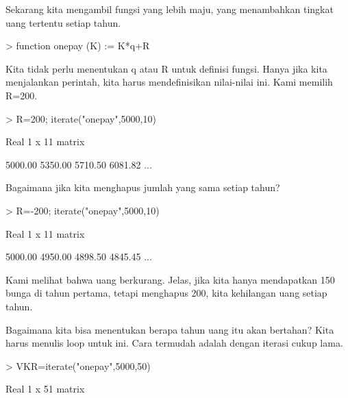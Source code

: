 \documentclass[a4paper,10pt]{article}
\begin{document}
\begin{eulernotebook}
\begin{eulercomment}
\begin{eulercomment}
\begin{eulercomment}
\begin{eulercomment}
\begin{eulercomment}
\begin{eulercomment}
\begin{eulercomment}
\begin{eulercomment}
\begin{eulercomment}
\begin{eulercomment}
\begin{eulercomment}
\begin{eulercomment}
\begin{eulercomment}
Sekarang kita mengambil fungsi yang lebih maju, yang menambahkan
tingkat uang tertentu setiap tahun.
\end{eulercomment}
\begin{eulerprompt}
> function onepay (K) := K*q+R
\end{eulerprompt}
\begin{eulercomment}
Kita tidak perlu menentukan q atau R untuk definisi fungsi. Hanya jika
kita menjalankan perintah, kita harus mendefinisikan nilai-nilai ini.
Kami memilih R=200.
\end{eulercomment}
\begin{eulerprompt}
> R=200; iterate("onepay",5000,10)
\end{eulerprompt}
\begin{euleroutput}
  Real 1 x 11 matrix
  
      5000.00     5350.00     5710.50     6081.82     ...
\end{euleroutput}
\begin{eulercomment}
Bagaimana jika kita menghapus jumlah yang sama setiap tahun?
\end{eulercomment}
\begin{eulerprompt}
> R=-200; iterate("onepay",5000,10)
\end{eulerprompt}
\begin{euleroutput}
  Real 1 x 11 matrix
  
      5000.00     4950.00     4898.50     4845.45     ...
\end{euleroutput}
\begin{eulercomment}
Kami melihat bahwa uang berkurang. Jelas, jika kita hanya mendapatkan
150 bunga di tahun pertama, tetapi menghapus 200, kita kehilangan uang
setiap tahun.

Bagaimana kita bisa menentukan berapa tahun uang itu akan bertahan?
Kita harus menulis loop untuk ini. Cara termudah adalah dengan iterasi
cukup lama.
\end{eulercomment}
\begin{eulerprompt}
> VKR=iterate("onepay",5000,50)
\end{eulerprompt}
\begin{euleroutput}
  Real 1 x 51 matrix
  

\end{euleroutput}
\end{eulercomment}
\end{eulercomment}
\end{eulercomment}
\end{eulercomment}
\end{eulercomment}
\end{eulercomment}
\end{eulercomment}
\end{eulercomment}
\end{eulercomment}
\end{eulercomment}
\end{eulercomment}
\end{eulercomment}
\end{eulernotebook}
\end{document}
